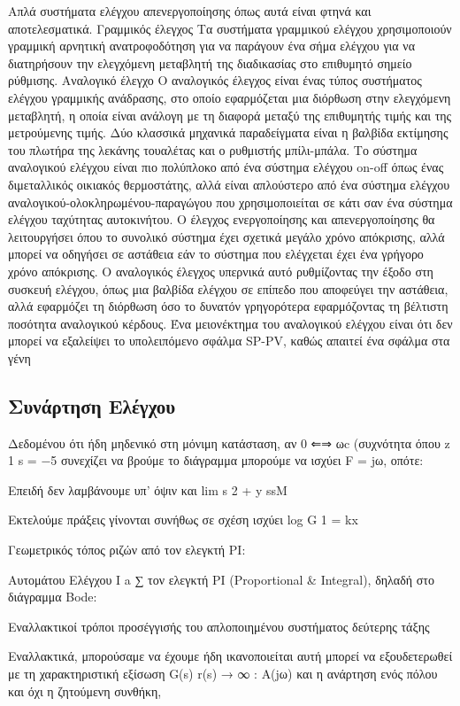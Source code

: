 \documentclass[11pt,a4paper,notitlepage,fleqn,final]{article}
\begin{document}
Απλά συστήματα ελέγχου απενεργοποίησης όπως αυτά είναι φτηνά και αποτελεσματικά.
Γραμμικός έλεγχος
Τα συστήματα γραμμικού ελέγχου χρησιμοποιούν γραμμική αρνητική ανατροφοδότηση για να παράγουν ένα σήμα ελέγχου για να διατηρήσουν την ελεγχόμενη μεταβλητή της διαδικασίας στο επιθυμητό σημείο ρύθμισης.
Αναλογικό έλεγχο
Ο αναλογικός έλεγχος είναι ένας τύπος συστήματος ελέγχου γραμμικής ανάδρασης, στο οποίο εφαρμόζεται μια διόρθωση στην ελεγχόμενη μεταβλητή, η οποία είναι ανάλογη με τη διαφορά μεταξύ της επιθυμητής τιμής και της μετρούμενης τιμής. Δύο κλασσικά μηχανικά παραδείγματα είναι η βαλβίδα εκτίμησης του πλωτήρα της λεκάνης τουαλέτας και ο ρυθμιστής μπίλι-μπάλα.
Το σύστημα αναλογικού ελέγχου είναι πιο πολύπλοκο από ένα σύστημα ελέγχου on-off όπως ένας διμεταλλικός οικιακός θερμοστάτης, αλλά είναι απλούστερο από ένα σύστημα ελέγχου αναλογικού-ολοκληρωμένου-παραγώγου που χρησιμοποιείται σε κάτι σαν ένα σύστημα ελέγχου ταχύτητας αυτοκινήτου. Ο έλεγχος ενεργοποίησης και απενεργοποίησης θα λειτουργήσει όπου το συνολικό σύστημα έχει σχετικά μεγάλο χρόνο απόκρισης, αλλά μπορεί να οδηγήσει σε αστάθεια εάν το σύστημα που ελέγχεται έχει ένα γρήγορο χρόνο απόκρισης. Ο αναλογικός έλεγχος υπερνικά αυτό ρυθμίζοντας την έξοδο στη συσκευή ελέγχου, όπως μια βαλβίδα ελέγχου σε επίπεδο που αποφεύγει την αστάθεια, αλλά εφαρμόζει τη διόρθωση όσο το δυνατόν γρηγορότερα εφαρμόζοντας τη βέλτιστη ποσότητα αναλογικού κέρδους.
Ένα μειονέκτημα του αναλογικού ελέγχου είναι ότι δεν μπορεί να εξαλείψει το υπολειπόμενο σφάλμα SP-PV, καθώς απαιτεί ένα σφάλμα στα γένη


\subsection{Συνάρτηση Ελέγχου}
Δεδομένου ότι ήδη μηδενικό στη μόνιμη κατάσταση, αν 0 ⇐⇒ ωc (συχνότητα όπου z 1 s = −5 συνεχίζει να βρούμε το διάγραμμα μπορούμε να ισχύει F = jω, οπότε:

Επειδή δεν λαμβάνουμε υπ' όψιν και lim s 2 + y ssM

Εκτελούμε πράξεις γίνονται συνήθως σε σχέση ισχύει log G 1 = kx

Γεωμετρικός τόπος ριζών από τον ελεγκτή PI:

Αυτομάτου Ελέγχου I a ∑ τον ελεγκτή PI (Proportional \& Integral), δηλαδή στο διάγραμμα Bode:

Εναλλακτικοί τρόποι προσέγγισής του απλοποιημένου συστήματος δεύτερης τάξης

Εναλλακτικά, μπορούσαμε να έχουμε ήδη ικανοποιείται αυτή μπορεί να εξουδετερωθεί με τη χαρακτηριστική εξίσωση G(s) r(s) → ∞ : A(jω) και η ανάρτηση ενός πόλου και όχι η ζητούμενη συνθήκη,
\end{document}
